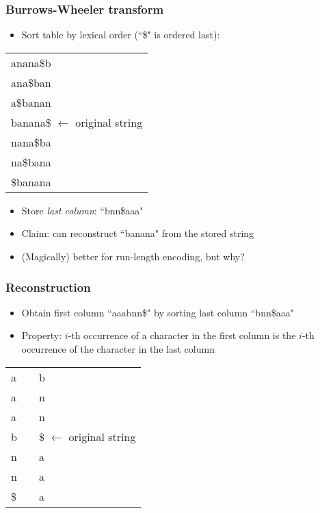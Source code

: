\documentclass{beamer}
\begin{document}
\begin{frame}
 \frametitle{Burrows-Wheeler transform}
 \begin{itemize}
  \item Sort table by lexical order (``\$" is ordered last):
 \end{itemize}
 \begin{center}
  \begin{tabular}{l}
   anana\$b \\
   ana\$ban \\
   a\$banan \\
   banana\$ $\leftarrow$ original string \\
   nana\$ba \\
   na\$bana \\
   \$banana \\
  \end{tabular}
 \end{center}
 \begin{itemize}
  \item Store \emph{last column}: ``bnn\$aaa"
  \item Claim: can reconstruct ``banana" from the stored string
  \item (Magically) better for run-length encoding, but why?
 \end{itemize}
\end{frame}

\begin{frame}
 \frametitle{Reconstruction}
 \begin{itemize}
  \item Obtain first column ``aaabnn\$" by sorting last column
        ``bnn\$aaa"
  \item Property: $i$-th occurrence of a character in the first column
        is the $i$-th occurrence of the character in the last column
 \end{itemize}
 \begin{center}
  \begin{tabular}{lll}
   a & \hspace{1.0cm} & b \\
   a & \hspace{1.0cm} & n \\
   a & \hspace{1.0cm} & n \\
   b & \hspace{1.0cm} & \$ $\leftarrow$ original string \\
   n & \hspace{1.0cm} & a \\
   n & \hspace{1.0cm} & a \\
   \$ & \hspace{1.0cm} & a \\
  \end{tabular}
 \end{center}
\end{frame}
\end{document}
